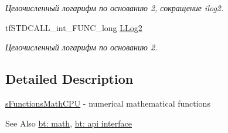 \begin{DoxyCompactItemize}
\begin{DoxyCompactList}\small\item\em Целочисленный логарифм по основанию 2, сокращение ilog2. \end{DoxyCompactList}\item 
\hypertarget{structs_functions_math_c_p_u_a547217f2a69ea0707ccca71fc4341b70}{tf\-S\-T\-D\-C\-A\-L\-L\-\_\-int\-\_\-\-F\-U\-N\-C\-\_\-long \hyperlink{structs_functions_math_c_p_u_a547217f2a69ea0707ccca71fc4341b70}{L\-Log2}}\label{structs_functions_math_c_p_u_a547217f2a69ea0707ccca71fc4341b70}

\begin{DoxyCompactList}\small\item\em Целочисленный логарифм по основанию 2. \end{DoxyCompactList}\end{DoxyCompactItemize}


\subsection{Detailed Description}
\hyperlink{structs_functions_math_c_p_u}{s\-Functions\-Math\-C\-P\-U} -\/ numerical mathematical functions 

\begin{DoxySeeAlso}{See Also}
\hyperlink{group__math}{bt\-: math}, \hyperlink{group__apiinterface}{bt\-: api interface} 
\end{DoxySeeAlso}


